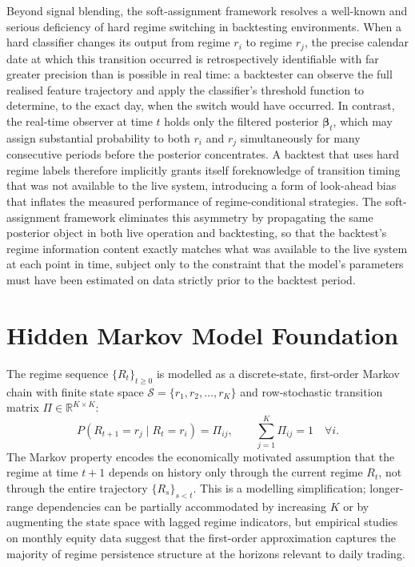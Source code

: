 \documentclass[12pt,openany]{book}
\numberwithin{equation}{chapter}
\theoremstyle{plain}
\theoremstyle{definition}
\theoremstyle{remark}
\begin{document}
Beyond signal blending, the soft-assignment framework resolves a well-known and serious deficiency of hard regime switching in backtesting environments. When a hard classifier changes its output from regime $r_i$ to regime $r_j$, the precise calendar date at which this transition occurred is retrospectively identifiable with far greater precision than is possible in real time: a backtester can observe the full realised feature trajectory and apply the classifier's threshold function to determine, to the exact day, when the switch would have occurred. In contrast, the real-time observer at time $t$ holds only the filtered posterior $\boldsymbol{\beta}_t$, which may assign substantial probability to both $r_i$ and $r_j$ simultaneously for many consecutive periods before the posterior concentrates. A backtest that uses hard regime labels therefore implicitly grants itself foreknowledge of transition timing that was not available to the live system, introducing a form of look-ahead bias that inflates the measured performance of regime-conditional strategies. The soft-assignment framework eliminates this asymmetry by propagating the same posterior object in both live operation and backtesting, so that the backtest's regime information content exactly matches what was available to the live system at each point in time, subject only to the constraint that the model's parameters must have been estimated on data strictly prior to the backtest period.




\section{Hidden Markov Model Foundation}

The regime sequence $\{R_t\}_{t \geq 0}$ is modelled as a discrete-state, first-order Markov chain with finite state space $\mathcal{S} = \{r_1, r_2, \ldots, r_K\}$ and row-stochastic transition matrix $\Pi \in \mathbb{R}^{K \times K}$:
\begin{equation}
    P(R_{t+1} = r_j \mid R_t = r_i) = \Pi_{ij}, \qquad \sum_{j=1}^K \Pi_{ij} = 1 \quad \forall i.
\end{equation}
The Markov property encodes the economically motivated assumption that the regime at time $t+1$ depends on history only through the current regime $R_t$, not through the entire trajectory $\{R_s\}_{s < t}$. This is a modelling simplification; longer-range dependencies can be partially accommodated by increasing $K$ or by augmenting the state space with lagged regime indicators, but empirical studies on monthly equity data suggest that the first-order approximation captures the majority of regime persistence structure at the horizons relevant to daily trading.
\end{document}
